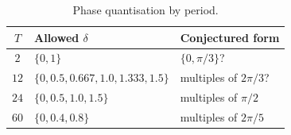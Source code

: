 \begin{table}[h]
\centering
\caption{Phase quantisation by period.}
\label{tab:phase-quant}
\begin{tabular}{cll}
\toprule
$T$ & Allowed $\delta$ & Conjectured form \\
\midrule
$2$  & $\{0,1\}$                       & $\{0,\pi/3\}$? \\
$12$ & $\{0,0.5,0.667,1.0,1.333,1.5\}$ & multiples of $2\pi/3$? \\
$24$ & $\{0,0.5,1.0,1.5\}$             & multiples of $\pi/2$ \\
$60$ & $\{0,0.4,0.8\}$                 & multiples of $2\pi/5$ \\
\bottomrule
\end{tabular}
\end{table}
